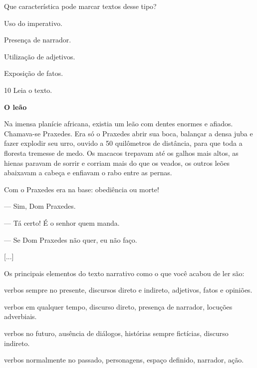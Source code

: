 Que característica pode marcar textos desse tipo?

\begin{escolha}
\item Uso do imperativo.

\item Presença de narrador.

\item Utilização de adjetivos.

\item Exposição de fatos.
\end{escolha}


\num{10} Leia o texto.

\begin{myquote}
\textbf{O leão}

Na imensa planície africana, existia um leão com dentes enormes e
afiados. Chamava-se Praxedes. Era só o Praxedes abrir sua boca, balançar
a densa juba e fazer explodir seu urro, ouvido a 50 quilômetros de
distância, para que toda a floresta tremesse de medo. Os macacos
trepavam até os galhos mais altos, as hienas paravam de sorrir e corriam
mais do que os veados, os outros leões abaixavam a cabeça e enfiavam o
rabo entre as pernas.

Com o Praxedes era na base: obediência ou morte!

--- Sim, Dom Praxedes.

--- Tá certo! É o senhor quem manda.

--- Se Dom Praxedes não quer, eu não faço.

{[}...{]}

\end{myquote}

Os principais elementos do texto narrativo como o que você acabou de ler
são:

\begin{escolha}
\item verbos sempre no presente, discursos direto e indireto, adjetivos, fatos e opiniões.

\item verbos em qualquer tempo, discurso direto, presença de narrador, locuções adverbiais.

\item verbos no futuro, ausência de diálogos, histórias sempre fictícias, discurso indireto.

\item verbos normalmente no passado, personagens, espaço definido, narrador, ação.
\end{escolha}


